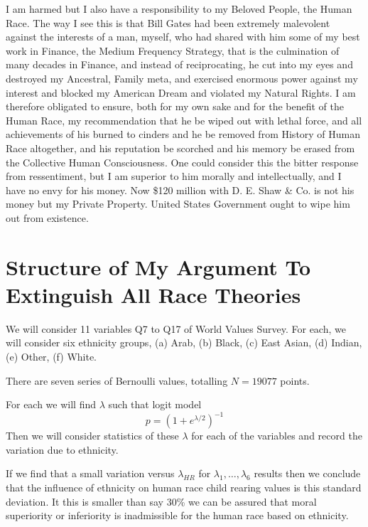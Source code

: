 \documentclass{amsart}
\begin{document}
I am harmed but I also have a responsibility to my Beloved People, the Human Race.  The way I see this is that Bill Gates had been extremely malevolent against the interests of a man, myself, who had shared with him some of my best work in Finance, the Medium Frequency Strategy, that is the culmination of many decades in Finance, and instead of reciprocating, he cut into my eyes and destroyed my Ancestral, Family meta, and exercised enormous power against my interest and blocked my American Dream and violated my Natural Rights.  I am therefore obligated to ensure, both for my own sake and for the benefit of the Human Race, my recommendation that he be wiped out with lethal force, and all achievements of his burned to cinders and he be removed from History of Human Race altogether, and his reputation be scorched and his memory be erased from the Collective Human Consciousness.  One could consider this the bitter response from ressentiment, but I am superior to him morally and intellectually, and I have no envy for his money. Now \$120 million with D. E. Shaw \& Co. is not his money but my Private Property.  United States Government ought to wipe him out from existence.

\section{Structure of My Argument To Extinguish All Race Theories}

We will consider 11 variables Q7 to Q17 of World Values Survey.  For each, we will consider six ethnicity groups, (a) Arab, (b) Black, (c) East Asian, (d) Indian, (e) Other, (f) White.

There are seven series of Bernoulli values, totalling $N=19077$ points.  

For each we will find $\lambda$ such that logit model 
\[
p=(1+e^{\lambda/2})^{-1}
\]
Then we will consider statistics of these $\lambda$ for each of the variables and record the variation due to ethnicity.  

If we find that a small variation versus $\lambda_{HR}$ for $\lambda_1,\dots,\lambda_6$ results then we conclude that the influence of ethnicity on human race child rearing values is this standard deviation.  It this is smaller than say 30\% we can be assured that moral superiority or inferiority is inadmissible for the human race based on ethnicity.
\end{document}
